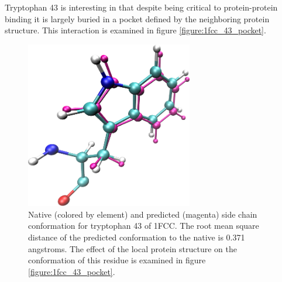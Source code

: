 Tryptophan 43 is interesting in that despite being critical to protein-protein binding it is largely buried in a pocket defined by the neighboring protein structure.
This interaction is examined in figure \protect\ref{figure:1fcc_43_pocket}.
\begin{figure}[h]
  \centering
  \includegraphics[width=0.65\textwidth,height=0.3\textheight,keepaspectratio]{figures/mutation_side_chain_images/1fcc_43.png}
  \caption{Native (colored by element) and predicted (magenta) side chain conformation for tryptophan 43 of 1FCC.
The root mean square distance of the predicted conformation to the native is 0.371 angstroms.
The effect of the local protein structure on the conformation of this residue is examined in figure \protect\ref{figure:1fcc_43_pocket}.}
  \label{figure:computational_mutation_scanning/1FCC_43}
\end{figure}

